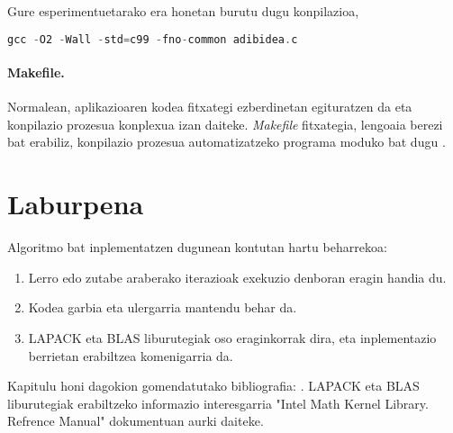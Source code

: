 Gure esperimentuetarako era honetan burutu dugu konpilazioa,
\begin{lstlisting}[language=C]
gcc -O2 -Wall -std=c99 -fno-common adibidea.c
\end{lstlisting}

\paragraph*{Makefile.}

Normalean, aplikazioaren kodea fitxategi ezberdinetan egituratzen da eta konpilazio prozesua konplexua izan daiteke. \emph{Makefile} fitxategia, lengoaia berezi bat erabiliz, konpilazio prozesua automatizatzeko programa moduko bat dugu \cite{EijkhoutHPC}. 

\section{Laburpena}

Algoritmo bat inplementatzen dugunean kontutan hartu beharrekoa:

\begin{enumerate}

\item Lerro edo zutabe araberako iterazioak exekuzio denboran eragin handia du.

\item Kodea garbia eta ulergarria mantendu behar da.

\item LAPACK eta BLAS liburutegiak oso eraginkorrak dira, eta inplementazio berrietan erabiltzea komenigarria da.


\end{enumerate}

Kapitulu honi dagokion gomendatutako bibliografia: \cite{Pacheco2011,EijkhoutHPC,Goedecker2001,Hogben2013}.
LAPACK eta BLAS liburutegiak erabiltzeko informazio interesgarria "Intel Math Kernel Library. Refrence Manual" \cite{Intel2015} dokumentuan aurki daiteke.
